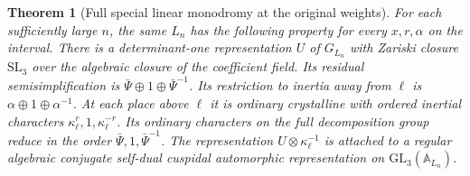\documentclass[a4paper,11pt]{article}
\newtheorem{theorem}[proposition]{Theorem}
\theoremstyle{definition}
\theoremstyle{remark}
\numberwithin{equation}{section}
\begin{document}
\begin{theorem}[Full special linear monodromy at the original weights]
\label{thm:slthree363}
For each sufficiently large \(n\), the same \(L_n\) has the
following property for every \(x,r,\alpha\) on the interval.
There is a determinant-one representation \(U\) of \(G_{L_n}\)
with Zariski closure \(\mathrm{SL}_3\) over the algebraic
closure of the coefficient field. Its residual semisimplification
is \(\bar\Psi\oplus1\oplus\bar\Psi^{-1}\). Its restriction to
inertia away from \(\ell\) is \(\alpha\oplus1\oplus\alpha^{-1}\).
At each place above \(\ell\) it is ordinary crystalline with
ordered inertial characters \(\kappa_\ell^r,1,\kappa_\ell^{-r}\).
Its ordinary characters on the full decomposition group reduce
in the order \(\bar\Psi,1,\bar\Psi^{-1}\).
The representation \(U\otimes\kappa_\ell^{-1}\) is attached to
a regular algebraic conjugate self-dual cuspidal automorphic
representation on \(\mathrm{GL}_3(\mathbb A_{L_n})\).
\end{theorem}
\end{document}
